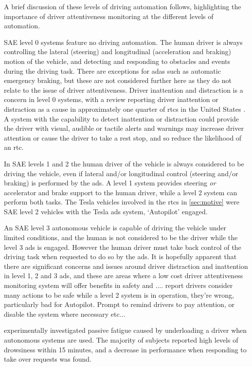 \documentclass[11pt, parskip=half*,twoside=false]{scrbook}
\begin{document}
A brief discussion of these levels of driving automation follows, highlighting the importance of driver attentiveness monitoring at the different levels of automation. 

SAE level 0 systems feature no driving automation. The human driver is always controlling the lateral (steering) and longitudinal (acceleration and braking) motion of the vehicle, and detecting and responding to obstacles and events during the driving task. There are exceptions for \gls{adas} such as automatic emergency braking, but these are not considered further here as they do not relate to the issue of driver attentiveness. Driver inattention and distraction is a concern in level 0 systems, with a review reporting driver inattention or distraction as a cause in approximately one quarter of \glspl{rtc} in the United States \citep{youngDriverDistraction2007}. A system with the capability to detect inattention or distraction could provide the driver with visual, audible or tactile alerts and warnings may increase driver attention or cause the driver to take a rest stop, and so reduce the likelihood of an \gls{rtc}.

In SAE levels 1 and 2 the human driver of the vehicle is always considered to be driving the vehicle, even if lateral and/or longitudinal control (steering and/or braking) is performed by the \gls{ads}. A level 1 system provides steering \emph{or} accelerator and brake support to the human driver, while a level 2 system can perform both tasks. The Tesla vehicles involved in the \glspl{rtc} in \cref{sec:motive} were SAE level 2 vehicles with the Tesla \gls{ads} system, `Autopilot' engaged. 

An SAE level 3 autonomous vehicle is capable of driving the vehicle under limited conditions, and the human is not considered to be the driver while the level 3 \gls{ads} is engaged. However the human driver must take back control of the driving task when requested to do so by the \gls{ads}. It is hopefully apparent that there are significant concerns and issues around driver distraction and inattention in level 1, 2 and 3 \gls{ads}, and these are areas where a low cost driver attentiveness monitoring system will offer benefits in safety and ....  \citet{teohWhatNameDrivers2020} report drivers consider many actions to be safe while a level 2 system is in operation, they're wrong, particularly bad for Autopilot. Prompt to remind drivers to pay attention, or disable the system where necessary etc...

\citet{goncalvesDrowsinessConditionalAutomation2016} experimentally investigated passive fatigue caused by underloading a driver when autonomous systems are used. The majority of subjects reported high levels of drowsiness within 15 minutes, and a decrease in performance when responding to take over requests was found.
\end{document}
